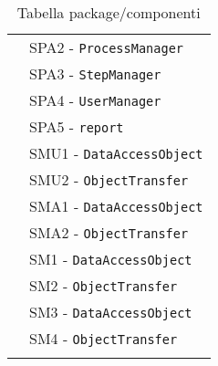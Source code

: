 \begin{longtable}{XX}
&SPA2 - \texttt{ProcessManager}\\
&SPA3 - \texttt{StepManager}\\
&SPA4 - \texttt{UserManager}\\
&SPA5 - \texttt{report}\\
\midrule
\daoUser{}&SMU1 - \texttt{DataAccessObject}\\
&SMU2 - \texttt{ObjectTransfer}\\
\midrule
\daoAdmin{}&SMA1 - \texttt{DataAccessObject}\\
&SMA2 - \texttt{ObjectTransfer}\\
\midrule
\daoProcess{}&SM1 - \texttt{DataAccessObject}\\
&SM2 - \texttt{ObjectTransfer}\\
\midrule
\daoStep{}&SM3 - \texttt{DataAccessObject}\\
&SM4 - \texttt{ObjectTransfer}\\
\bottomrule
\caption{Tabella package/componenti}
\end{longtable}
